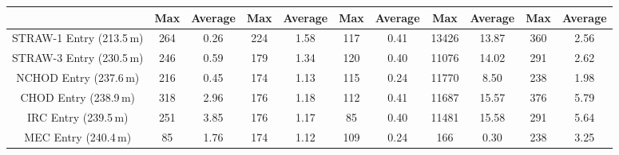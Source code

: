 \documentclass[../../main.tex]{subfiles}
\begin{document}
\begin{table}[htbp]
{\begin{tabular}{|c|clllllllll|}
            \multicolumn{1}{|l|}{} & 
            \multicolumn{1}{c|}{\textbf{Max}} & 
            \multicolumn{1}{c|}{\textbf{Average}} & 
            \multicolumn{1}{c|}{\textbf{Max}} & 
            \multicolumn{1}{c|}{\textbf{Average}} & 
            \multicolumn{1}{c|}{\textbf{Max}} & 
            \multicolumn{1}{c|}{\textbf{Average}} &  
            \multicolumn{1}{c|}{\textbf{Max}} & 
            \multicolumn{1}{c|}{\textbf{Average}} & 
            \multicolumn{1}{c|}{\textbf{Max}} & 
            \textbf{Average} \\ \hline
            STRAW-1 Entry (213.5\,m) & \multicolumn{1}{c|}{264} & \multicolumn{1}{c|}{0.26} & \multicolumn{1}{c|}{224} & \multicolumn{1}{c|}{1.58} & \multicolumn{1}{c|}{117} & \multicolumn{1}{c|}{0.41} & \multicolumn{1}{c|}{13426} & \multicolumn{1}{c|}{13.87} & \multicolumn{1}{c|}{360} & \multicolumn{1}{c|}{2.56} \\ \hline
            STRAW-3 Entry (230.5\,m) & \multicolumn{1}{c|}{246} & \multicolumn{1}{c|}{0.59} & \multicolumn{1}{c|}{179} & \multicolumn{1}{c|}{1.34} &  \multicolumn{1}{c|}{120} & \multicolumn{1}{c|}{0.40} & \multicolumn{1}{c|}{11076} & \multicolumn{1}{c|}{14.02} & \multicolumn{1}{c|}{291} & \multicolumn{1}{c|}{2.62} \\ \hline
            NCHOD Entry (237.6\,m) & \multicolumn{1}{c|}{216} & \multicolumn{1}{c|}{0.45} & \multicolumn{1}{c|}{174} & \multicolumn{1}{c|}{1.13} & \multicolumn{1}{c|}{115} & \multicolumn{1}{c|}{0.24} & \multicolumn{1}{c|}{11770} & \multicolumn{1}{c|}{8.50} & \multicolumn{1}{c|}{238} & \multicolumn{1}{c|}{1.98}\\ \hline
            CHOD Entry (238.9\,m) & \multicolumn{1}{c|}{318} & \multicolumn{1}{c|}{2.96} & \multicolumn{1}{c|}{176} & \multicolumn{1}{c|}{1.18} & \multicolumn{1}{c|}{112} & \multicolumn{1}{c|}{0.41} & \multicolumn{1}{c|}{11687} & \multicolumn{1}{c|}{15.57} & \multicolumn{1}{c|}{376} & \multicolumn{1}{c|}{5.79} \\ \hline
            IRC Entry (239.5\,m) & \multicolumn{1}{c|}{251} & \multicolumn{1}{c|}{3.85} & \multicolumn{1}{c|}{176} & \multicolumn{1}{c|}{1.17} & \multicolumn{1}{c|}{85} & \multicolumn{1}{c|}{0.40} & \multicolumn{1}{c|}{11481} & \multicolumn{1}{c|}{15.58} & \multicolumn{1}{c|}{291} & \multicolumn{1}{c|}{5.64}\\ \hline
            MEC Entry (240.4\,m) & \multicolumn{1}{c|}{85} & \multicolumn{1}{c|}{1.76} & \multicolumn{1}{c|}{174} &  \multicolumn{1}{c|}{1.12} & \multicolumn{1}{c|}{109} & \multicolumn{1}{c|}{0.24} & \multicolumn{1}{c|}{166} & \multicolumn{1}{c|}{0.30} & \multicolumn{1}{c|}{238} & \multicolumn{1}{c|}{3.25}\\ \hline

\end{tabular}}
\end{table}
\end{document}
